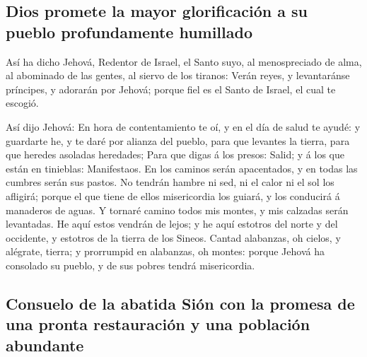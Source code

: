 \hypertarget{dios-promete-la-mayor-glorificaciuxf3n-a-su-pueblo-profundamente-humillado}{%
\subsection{Dios promete la mayor glorificación a su pueblo
profundamente
humillado}\label{dios-promete-la-mayor-glorificaciuxf3n-a-su-pueblo-profundamente-humillado}}

 Así ha dicho Jehová, Redentor de Israel, el Santo suyo,
al menospreciado de alma, al abominado de las gentes, al siervo de los
tiranos: Verán reyes, y levantaránse príncipes, y adorarán por Jehová;
porque fiel es el Santo de Israel, el cual te escogió.

 Así dijo Jehová: En hora de contentamiento te oí, y en el
día de salud te ayudé: y guardarte he, y te daré por alianza del pueblo,
para que levantes la tierra, para que heredes asoladas heredades;
 Para que digas á los presos: Salid; y á los que están en
tinieblas: Manifestaos. En los caminos serán apacentados, y en todas las
cumbres serán sus pastos.  No tendrán hambre ni sed, ni
el calor ni el sol los afligirá; porque el que tiene de ellos
misericordia los guiará, y los conducirá á manaderos de aguas.
 Y tornaré camino todos mis montes, y mis calzadas serán
levantadas.  He aquí estos vendrán de lejos; y he aquí
estotros del norte y del occidente, y estotros de la tierra de los
Sineos.  Cantad alabanzas, oh cielos, y alégrate, tierra;
y prorrumpid en alabanzas, oh montes: porque Jehová ha consolado su
pueblo, y de sus pobres tendrá misericordia.

\hypertarget{consuelo-de-la-abatida-siuxf3n-con-la-promesa-de-una-pronta-restauraciuxf3n-y-una-poblaciuxf3n-abundante}{%
\subsection{Consuelo de la abatida Sión con la promesa de una pronta
restauración y una población
abundante}\label{consuelo-de-la-abatida-siuxf3n-con-la-promesa-de-una-pronta-restauraciuxf3n-y-una-poblaciuxf3n-abundante}}

